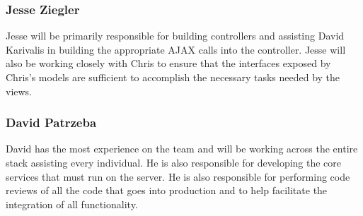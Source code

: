 \subsubsection{Jesse Ziegler}
Jesse will be primarily responsible for building controllers and assisting David
Karivalis in building the appropriate AJAX calls into the controller.  Jesse
will also be working closely with Chris to ensure that the interfaces exposed
by Chris's models are sufficient to accomplish the necessary tasks needed by
the views.
\subsubsection{David Patrzeba}
David has the most experience on the team and will be working across the entire
stack assisting every individual.  He is also responsible for developing the
core services that must run on the server. He is also responsible for performing
code reviews of all the code that goes into production and to help facilitate
the integration of all functionality.

